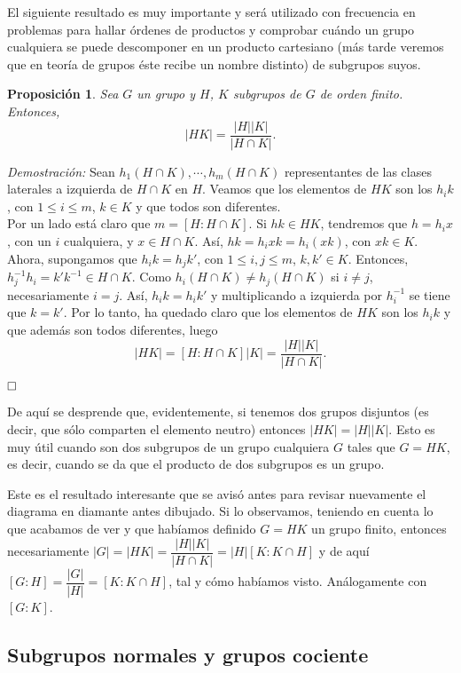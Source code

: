\documentclass[12pt]{article}
\newtheorem{proposition}[theorem]{Proposición}
\begin{document}
El siguiente resultado es muy importante y será utilizado con frecuencia en problemas para hallar órdenes de productos y comprobar cuándo un grupo cualquiera se puede descomponer en un producto cartesiano (más tarde veremos que en teoría de grupos éste recibe un nombre distinto) de subgrupos suyos.

\begin{proposition} Sea $G$ un grupo y $H$, $K$ subgrupos de $G$ de orden finito. Entonces, $$|HK| = \dfrac{|H||K|}{|H \cap K|}.$$
\end{proposition}
\emph{Demostración: } Sean $h_{1}(H \cap K), \cdots, h_{m}(H \cap K)$ representantes de las clases laterales a izquierda de $H\cap K$ en $H$. Veamos que los elementos de $HK$ son los $h_{i}k$, con $1 \leq i \leq m$, $k \in K$ y que todos son diferentes.\vspace{0.2cm}\\
Por un lado está claro que $m = [H : H \cap K ]$. Si $hk \in HK$, tendremos que $h = h_{i}x$, con un $i$ cualquiera, y $x \in H \cap K$. Así, $hk = h_{i}xk = h_{i}(xk)$, con $xk \in K$. Ahora, supongamos que $h_{i}k =h_{j}k'$, con $1 \leq i,j \leq m$, $k, k' \in K$. Entonces, $h_{j}^{-1}h_{i} = k'k^{-1} \in H \cap K$. Como $h_{i}(H \cap K) \neq h_{j}(H \cap K)$ si $i \neq j$, necesariamente $i =j$. Así, $h_{i}k =h_{i}k'$ y multiplicando a izquierda por $h_{i}^{-1}$ se tiene que $k = k'$. Por lo tanto, ha quedado claro que los elementos de $HK$ son los $h_{i}k$ y que además son todos diferentes, luego $$|HK| = [H : H\cap K]|K| = \dfrac{|H||K|}{|H \cap K|}.$$

$\hfill \square$

De aquí se desprende que, evidentemente, si tenemos dos grupos disjuntos (es decir, que sólo comparten el elemento neutro) entonces $|HK| = |H||K|$. Esto es muy útil cuando son dos subgrupos de un grupo cualquiera $G$ tales que $G = HK$, es decir, cuando se da que el producto de dos subgrupos es un grupo.

Este es el resultado interesante que se avisó antes para revisar nuevamente el diagrama en diamante antes dibujado. Si lo observamos, teniendo en cuenta lo que acabamos de ver y que habíamos definido $G= HK$ un grupo finito, entonces necesariamente $|G| =|HK| = \dfrac{|H| |K|}{|H \cap K |} = |H| [K : K \cap H]$ y de aquí $[G:H] = \dfrac{|G|}{|H|} = [K : K \cap H]$, tal y cómo habíamos visto. Análogamente con $[G:K]$.

\subsection{Subgrupos normales y grupos cociente}
\end{document}
